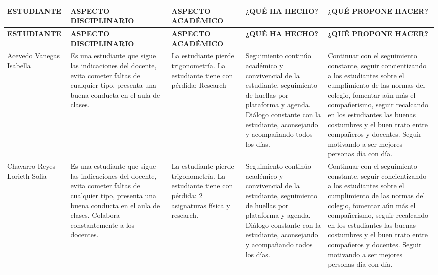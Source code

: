 \documentclass[spanish,11pt,a4paper]{article}
\begin{document}
	\begin{longtable}{|p{3.5cm}|p{3.5cm}|p{3.5cm}|p{3.5cm}|p{3.5cm}|}
		\hline
		\textbf{ESTUDIANTE} & \textbf{ASPECTO DISCIPLINARIO} & \textbf{ASPECTO ACADÉMICO} & \textbf{¿QUÉ HA HECHO?} & \textbf{¿QUÉ PROPONE HACER?} \\
		\hline \hline
		\endfirsthead
		
		\hline
		\textbf{ESTUDIANTE} & \textbf{ASPECTO DISCIPLINARIO} & \textbf{ASPECTO ACADÉMICO} & \textbf{¿QUÉ HA HECHO?} & \textbf{¿QUÉ PROPONE HACER?} \\
		\hline \hline
		\endhead
		
		Acevedo Vanegas Isabella & 
		Es una estudiante que sigue las indicaciones del docente, evita cometer faltas de cualquier tipo, presenta una buena conducta en el aula de clases. & 
		La estudiante pierde trigonometría. 
		La estudiante tiene con pérdida: Research& 
		Seguimiento continúo académico y convivencial de la estudiante, seguimiento de huellas por plataforma y agenda. Diálogo constante con la estudiante, aconsejando y acompañando todos los días. & 
		Continuar con el seguimiento constante, seguir concientizando a los estudiantes sobre el cumplimiento de las normas del colegio, fomentar aún más el compañerismo, seguir recalcando en los estudiantes las buenas costumbres y el buen trato entre compañeros y docentes. Seguir motivando a ser mejores personas día con día.\\
		\hline
		
		Chavarro Reyes Lorieth Sofia & 
		Es una estudiante que sigue las indicaciones del docente, evita cometer faltas de cualquier tipo, presenta una buena conducta en el aula de clases. Colabora constantemente a los docentes. & 
		La estudiante pierde trigonometría.
		La estudiante tiene con pérdida: 2 asignaturas física y research.& 
		Seguimiento continúo académico y convivencial de la estudiante, seguimiento de huellas por plataforma y agenda. Diálogo constante con la estudiante, aconsejando y acompañando todos los días. & 
		Continuar con el seguimiento constante, seguir concientizando a los estudiantes sobre el cumplimiento de las normas del colegio, fomentar aún más el compañerismo, seguir recalcando en los estudiantes las buenas costumbres y el buen trato entre compañeros y docentes. Seguir motivando a ser mejores personas día con día.\\
		\hline
		

\end{longtable}
\end{document}
